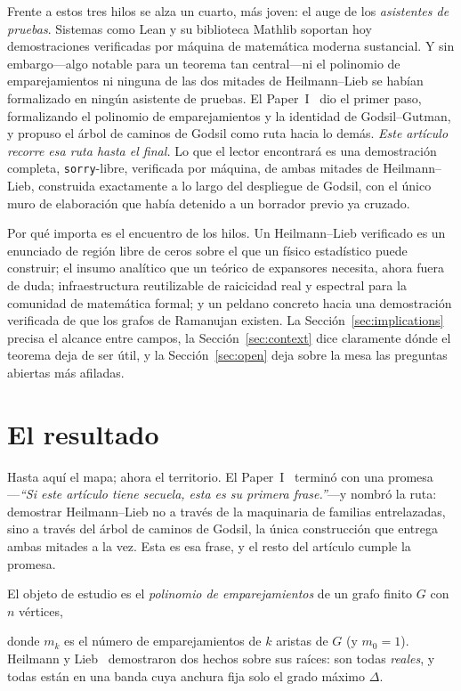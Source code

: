 \documentclass[11pt]{article}
\newcommand{\lean}[1]{{\def\_{\textunderscore\allowbreak}\texttt{#1}}}
\newcommand{\keyeq}[1]{\begin{center}\keybox{$\displaystyle #1$}\end{center}}
\begin{document}
Frente a estos tres hilos se alza un cuarto, m\'as joven: el auge de los
\emph{asistentes de pruebas}. Sistemas como Lean y su biblioteca Mathlib soportan
hoy demostraciones verificadas por m\'aquina de matem\'atica moderna sustancial. Y
sin embargo---algo notable para un teorema tan central---ni el polinomio de
emparejamientos ni ninguna de las dos mitades de Heilmann--Lieb se hab\'ian
formalizado en ning\'un asistente de pruebas. El Paper~I~\cite{PartI} dio el primer
paso, formalizando el polinomio de emparejamientos y la identidad de
Godsil--Gutman, y propuso el \'arbol de caminos de Godsil como ruta hacia lo
dem\'as. \emph{Este art\'iculo recorre esa ruta hasta el final.} Lo que el lector
encontrar\'a es una demostraci\'on completa, \lean{sorry}-libre, verificada por
m\'aquina, de ambas mitades de Heilmann--Lieb, construida exactamente a lo largo del
despliegue de Godsil, con el \'unico muro de elaboraci\'on que hab\'ia detenido a un
borrador previo ya cruzado.

Por qu\'e importa es el encuentro de los hilos. Un Heilmann--Lieb verificado es un
enunciado de regi\'on libre de ceros sobre el que un f\'isico estad\'istico puede
construir; el insumo anal\'itico que un te\'orico de expansores necesita, ahora
fuera de duda; infraestructura reutilizable de raicicidad real y espectral para la
comunidad de matem\'atica formal; y un peldano concreto hacia una demostraci\'on
verificada de que los grafos de Ramanujan existen. La Secci\'on~\ref{sec:implications}
precisa el alcance entre campos, la Secci\'on~\ref{sec:context} dice claramente
d\'onde el teorema deja de ser \'util, y la Secci\'on~\ref{sec:open} deja sobre la
mesa las preguntas abiertas m\'as afiladas.

\section{El resultado}
\label{sec:intro}

Hasta aqu\'i el mapa; ahora el territorio. El Paper~I~\cite{PartI} termin\'o con una
promesa---\emph{``Si este art\'iculo tiene secuela, esta es su primera frase.''}---y
nombr\'o la ruta: demostrar Heilmann--Lieb no a trav\'es de la maquinaria de
familias entrelazadas, sino a trav\'es del \'arbol de caminos de Godsil, la \'unica
construcci\'on que entrega ambas mitades a la vez. Esta es esa frase, y el resto del
art\'iculo cumple la promesa.

El objeto de estudio es el \emph{polinomio de emparejamientos} de un grafo finito
$G$ con $n$ v\'ertices,
\keyeq{\mu_G(x)\;=\;\sum_{k\ge0}(-1)^k\,m_k\,x^{\,n-2k},}
donde $m_k$ es el n\'umero de emparejamientos de $k$ aristas de $G$ (y $m_0=1$).
Heilmann y Lieb~\cite{HeilmannLieb1972} demostraron dos hechos sobre sus ra\'ices:
son todas \emph{reales}, y todas est\'an en una banda cuya anchura fija solo el
grado m\'aximo $\Delta$.
\end{document}
